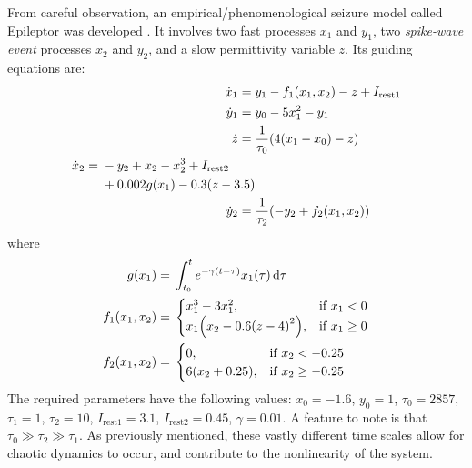From careful observation, an empirical/phenomenological seizure model called Epileptor was developed \cite{Jirsa2014,Jirsa2017}.
It involves two fast processes $x_{1}$ and $y_{1}$, two \textit{spike-wave event} processes $x_{2}$ and $y_{2}$, and a slow permittivity variable $z$.
Its guiding equations are:
\begin{align}
  \label{eq:epileptor_x1}
  \dot{x}_{1}
  ={}&
    y_{1}
    -
    f_{1}(x_{1}, x_{2})
    -
    z
    +
    I_{\text{rest} 1} \\
  \label{eq:epileptor_y1}
  \dot{y}_{1}
  ={}&
    y_{0}
    -
    5 x_{1}^{2}
    -
    y_{1} \\
  \label{eq:epileptor_z}
  \dot{z}
  ={}&
    \frac{1}{\tau_{0}} \pqty{4 \pqty{x_{1} - x_{0}} - z} \\
  \begin{split}
  \label{eq:epileptor_x2}
  \dot{x}_{2}
  ={}&
    -y_{2}
    +
    x_{2}
    -
    x_{2}^{3}
    +
    I_{\text{rest} 2} \\
    & +
    0.002 g(x_{1})
    -
    0.3 \pqty{z - 3.5} \\
  \end{split} \\
  \label{eq:epileptor_y2}
  \dot{y}_{2}
  ={}&
    \frac{1}{\tau_{2}} \pqty{-y_{2} + f_{2}(x_{1}, x_{2})}
\end{align}
where
\begin{align}
  \label{eq:epileptor_g}
  g(x_{1})
  ={}&
    \int_{t_{0}}^{t}{e^{-\gamma \pqty{t - \tau}} x_{1}(\tau) \dd{\tau}} \\
  \label{eq:epileptor_f1}
  f_{1}(x_{1}, x_{2})
  ={}&
    \begin{cases}
      x_{1}^{3} - 3 x_{1}^{2},
      & \text{if } x_{1} < 0 \\
      x_{1} \pqty{x_{2} - 0.6 \pqty{z - 4}^{2}},
      & \text{if }
      x_{1} \geq 0
    \end{cases} \\
  \label{eq:epileptor_f2}
  f_{2}(x_{1}, x_{2})
  ={}&
    \begin{cases}
      0,
      & \text{if } x_{2} < -0.25 \\
      6 \pqty{x_{2} + 0.25},
      & \text{if } x_{2} \geq -0.25
    \end{cases}
\end{align}
The required parameters have the following values: $x_{0} = -1.6$, $y_{0} = 1$, $\tau_{0} = 2857$, $\tau_{1} = 1$, $\tau_{2} = 10$, $I_{\text{rest} 1} = 3.1$, $I_{\text{rest} 2} = 0.45$, $\gamma = 0.01$.
A feature to note is that $\tau_{0} \gg \tau_{2} \gg \tau_{1}$.
As previously mentioned, these vastly different time scales allow for chaotic dynamics to occur, and contribute to the nonlinearity of the system.

